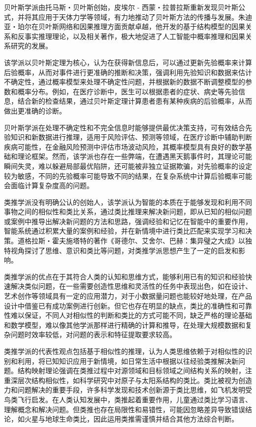 贝叶斯学派由托马斯・贝叶斯创始，皮埃尔 - 西蒙・拉普拉斯重新发现贝叶斯公式，并将其应用于天体力学等领域，有力地推动了贝叶斯方法的传播与发展。朱迪亚・珀尔在贝叶斯网络和因果推理方面贡献卓越，他开发的基于结构模型的因果关系和反事实推理理论，以及相关著作，极大地促进了人工智能中概率推理和因果关系研究的发展。


该学派以贝叶斯定理为核心，认为在获得新信息后，可以通过更新先验概率来计算后验概率，从而对事件进行更准确的推断和决策，强调利用先验知识和数据来估计不确定性，通过概率模型来处理不确定性问题，并根据新的数据不断调整模型的参数和概率分布。例如，在医疗诊断中，医生可以根据患者的症状、病史等先验信息，结合新的检查结果，通过贝叶斯定理计算患者患有某种疾病的后验概率，从而做出更准确的诊断。


贝叶斯学派在处理不确定性和不完全信息时能够提供最优决策支持，可有效结合先验知识和新数据进行推理，适用于风险评估、预测等领域，在医疗诊断中辅助判断疾病可能性，在金融风险预测中评估市场波动风险，其概率模型具有良好的数学基础和理论框架。然而，该学派也存在一些弊端，在遭遇黑天鹅事件时，其理论可能瞬间失灵，难以躲避局部最优陷阱，还可能被非独立证据欺骗，对先验概率的设定较为敏感，不同的先验概率可能导致不同的结果，在复杂系统中计算后验概率可能会面临计算复杂度高的问题。



类推学派没有明确公认的创始人，该学派认为智能的本质在于能够发现和利用不同事物之间的相似性和类比关系，通过类比推理来解决新问题，即从已知的相似问题或案例中推导出解决新问题的方法和思路，强调经验和记忆在智能中的重要作用，智能系统通过积累大量的案例和经验，并在新情境中进行类比匹配来实现学习和决策。道格拉斯・霍夫施塔特的著作《哥德尔、艾舍尔、巴赫：集异璧之大成》以独特视角探讨了思维、意识和类比等问题，对类推学派思想产生了一定的启发和影响。


类推学派的优点在于其符合人类的认知和思维方式，能够利用已有的知识和经验快速解决类似问题，在一些需要创造性思维和灵活性的任务中表现出色，如在设计、艺术创作等领域具有一定的应用潜力，对于小数据量问题也能较好地处理，在产品设计中借鉴已有成功案例进行创新。但它也存在明显的缺点，类比的准确性和可靠性难以保证，不同人对相似性的判断和类比的方式可能不同，缺乏严格的理论基础和数学模型，难以像其他学派那样进行精确的计算和推导，在处理大规模数据和复杂问题时效率较低，对问题的表示和特征提取要求较高。


类推学派的代表性观点包括基于相似性的推理，认为人类思维依赖于对相似性的识别和利用，将已知知识应用于新情境，如日常生活中根据以往经验类推解决新问题。结构映射理论强调在类推过程中对源领域和目标领域之间结构关系的映射，注重深层次结构相似性，如科学研究中对原子与太阳系结构的类比。类比被视为创造力和问题解决的重要手段，许多科学发现和技术创新源于类比思维，如飞机发明受鸟类飞行启发。在人类认知发展中，类推起着重要作用，儿童通过类比学习语言、理解概念和解决问题。但类推也存在局限性和易错性，可能因忽略差异导致错误结论，如火星与地球生命类比，因此运用类推需谨慎并结合其他方法综合判断。


